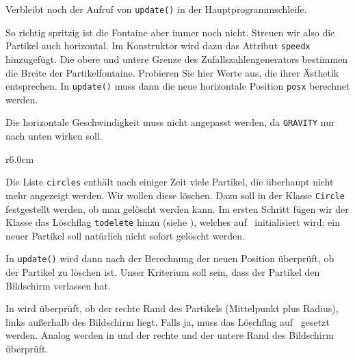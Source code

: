 
Verbleibt noch der Aufruf von \texttt{update()} in der Hauptprogrammschleife.


So richtig spritzig ist die Fontaine aber immer noch nicht. Streuen wir also die Partikel auch horizontal. Im Konstruktor wird dazu das Attribut \texttt{speedx} hinzugefügt. Die obere und untere Grenze des Zufallszahlengenerators bestimmen die Breite der Partikelfontaine. Probieren Sie hier Werte aus, die ihrer Ästhetik entsprechen. In \texttt{update()} muss dann die neue horizontale Position \texttt{posx} berechnet werden. 

Die horizontale Geschwindigkeit muss nicht angepasst werden, da \texttt{GRAVITY} nur nach unten wirken soll.


\begin{wrapfigure}[17]{r}{6.0cm}%
	\begin{center}%
		\vspace{-1cm}%
	\end{center}%
\end{wrapfigure}%
Die Liste \texttt{circles} enthält nach einiger Zeit viele Partikel, die überhaupt nicht mehr angezeigt werden. Wir wollen diese löschen. Dazu soll in der Klasse \texttt{Circle} festgestellt werden, ob man gelöscht werden kann. Im ersten Schritt fügen wir der Klasse das Löschflag \texttt{todelete} hinzu (siehe ), welches auf \false\ initialisiert wird; ein neuer Partikel soll natürlich nicht sofort gelöscht werden.

In \texttt{update()} wird dann nach der Berechnung der neuen Position überprüft, ob der Partikel zu löschen ist. Unser Kriterium soll sein, dass der Partikel den Bildschirm verlassen hat.

In  wird überprüft, ob der rechte Rand des Partikels (Mittelpunkt plus Radius), links außerhalb des Bildschirm liegt. Falls ja, muss das Löschflag auf \true\ gesetzt werden. Analog werden in  und  der rechte und der untere Rand des Bildschirm überprüft. 

